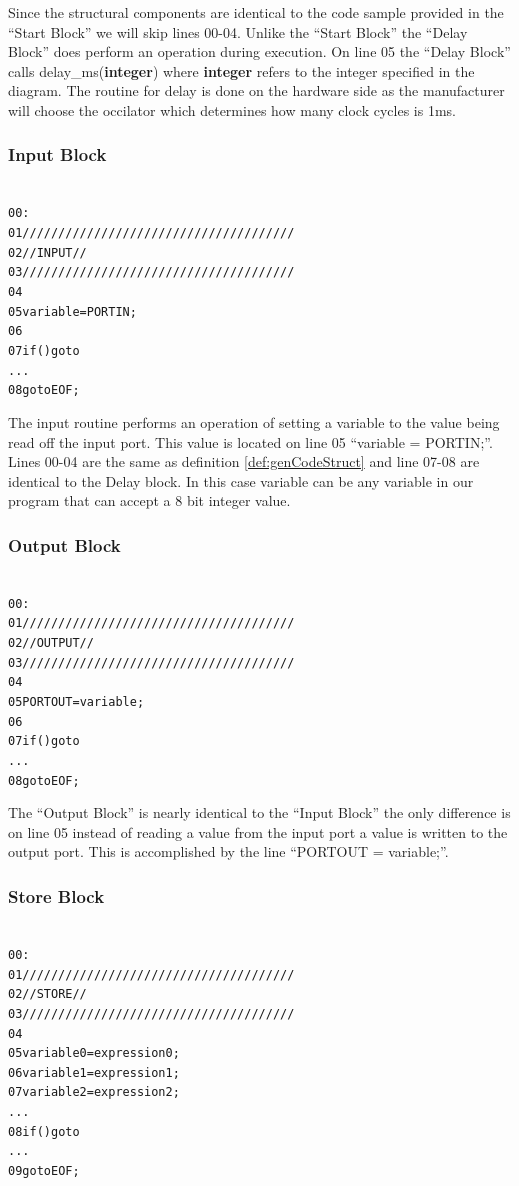 Since the structural components are identical to the code sample provided in the ``Start Block'' we will skip lines 00-04. Unlike the ``Start Block'' the ``Delay Block'' does perform an operation during execution. On line 05 the ``Delay Block'' calls delay\_ms(\textbf{integer}) where \textbf{integer} refers to the integer specified in the diagram. The routine for delay is done on the hardware side as the manufacturer will choose the occilator which determines how many clock cycles is 1ms.

\subsubsection{Input Block}
\begin{alltt}
\label{def:cmpinputblock}
00 :
01 //////////////////////////////////////
02 //        INPUT                     //
03 //////////////////////////////////////
04
05 variable = PORTIN;
06 
07 if () goto 
     ...
08 goto EOF;
\end{alltt}

The input routine performs an operation of setting a variable to the value being read off the input port. This value is located on line 05 ``variable = PORTIN;''. Lines 00-04 are the same as definition \ref{def:genCodeStruct} and line 07-08 are identical to the Delay block. In this case variable can be any variable in our program that can accept a 8 bit integer value.


\subsubsection{Output Block}
\begin{alltt}
\label{def:cmpoutputblock}
00 :
01 //////////////////////////////////////
02 //        OUTPUT                    //
03 //////////////////////////////////////
04
05 PORTOUT = variable;
06 
07 if () goto 
     ...
08 goto EOF;
\end{alltt}

The ``Output Block'' is nearly identical to the ``Input Block'' the only difference is on line 05 instead of reading a value from the input port a value is written to the output port. This is accomplished by the line ``PORTOUT = variable;''.

\subsubsection{Store Block}
\begin{alltt}
\label{def:cmpstoreblock}
00 :
01 //////////////////////////////////////
02 //        STORE                     //
03 //////////////////////////////////////
04
05 variable0 = expression0;
06 variable1 = expression1;
07 variable2 = expression2;
     ...
08 if () goto 
     ...
09 goto EOF;
\end{alltt}

